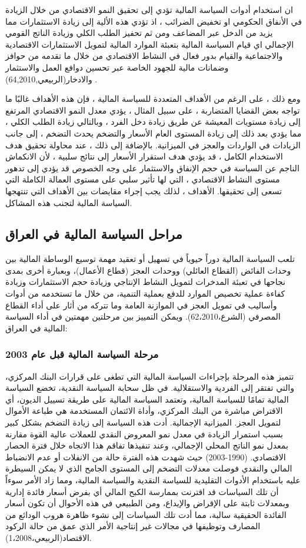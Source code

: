 \documentclass[10pt,a4paper]{report}
\begin{document}
\begin{doublespacing}
ان استخدام أدوات السياسة المالية تؤدي إلى تحقيق النمو الاقتصادي من خلال الزيادة في الأنفاق الحكومي او تخفيض الضرائب ، اذ تؤدي هذه الألية إلى زيادة الاستثمارات مما يزيد من الدخل عبر المضاعف ومن ثم تحفيز الطلب الكلي وزيادة الناتج القومي الإجمالي اي قيام السياسة المالية بتعبئة الموارد المالية لتمويل الاستثمارات الاقتصادية والاجتماعية والقيام بدور فعال في النشاط الاقتصادي من خلال ما تقدمه من حوافز وضمانات مالية للجهود الخاصة عبر تحسين دوافع العمل والاستثمار والادخار(الربيعي,64,2010) .

ومع ذلك ، على الرغم من الأهداف المتعددة للسياسة المالية ، فإن هذه الأهداف غالبًا ما تواجه بعض القضايا المتضاربة ، على سبيل المثال ، يؤدي معدل النمو الاقتصادي المرتفع إلى زيادة مستويات المعيشة عن طريق زيادة دخل الفرد ، وبالتالي زيادة الطلب الكلي ، مما يؤدي بعد ذلك إلى زيادة المستوى العام الأسعار والتضخم يحدث التضخم ، إلى جانب الزيادات في الواردات والعجز في الميزانية. بالإضافة إلى ذلك ، عند محاولة تحقيق هدف الاستخدام الكامل ، قد يؤدي هدف استقرار الأسعار إلى نتائج سلبية ، لأن الانكماش الناجم عن السياسة في حجم الإنفاق والاستثمار على وجه الخصوص قد يؤدي إلى تدهور مستوى النشاط الاقتصادي ، التي لها تأثير سلبي على مستوى العمالة الكاملة التي تسعى إلى تحقيقها. الأهداف ، لذلك يجب إجراء مقايضات بين الأهداف التي تنتهجها السياسة المالية لتجنب هذه المشاكل.
\subsection{مراحل السياسة المالية في العراق}
تلعب السياسة المالية دوراً حيوياً في تسهيل أو تعقيد مهمة توسيع الوساطة المالية بين وحدات الفائض (القطاع العائلي) ووحدات العجز (قطاع الأعمال)، وبعبارة أخرى بمدى نجاحها في تعبئة المدخرات لتمويل النشاط الإنتاجي وزيادة حجم الاستثمارات وزيادة كفاءة عملية تخصيص الموارد للدفع بعملية التنمية، من خلال ما تستخدمه من أدوات وأساليب في تمويل العجز في الموازنة العامة وما تتركه من أثار على أداء القطاع المصرفي (الشرع،62،2010). ويمكن التمييز بين مرحلتين مهمتين في أداء السياسة المالية في العراق:
\subsubsection{مرحلة السياسة المالية قبل عام 2003}
تتميز هذه المرحلة بإجراءات السياسة المالية التي تطغى على قرارات البنك المركزي، والتي تفتقر إلى الفردية والاستقلالية. في ظل سحابة السياسة النقدية، تخضع السياسة المالية تمامًا للسياسة المالية، وتعتمد السياسة المالية على طريقة تسييل الديون، أي الاقتراض مباشرة من البنك المركزي، وأداة الائتمان المستخدمة هي طباعة الأموال لتمويل العجز. الميزانية الإجمالية. أدت هذه السياسة إلى زيادة التضخم بشكل كبير بسبب استمرار الزيادة في معدل نمو المعروض النقدي للعملات عالية القوة مقارنة بمعدل نمو الناتج المحلي الإجمالي، وعند تنفيذها تفاقم هذا الاتجاه خلال فترة الحصار الاقتصادي. (1990-2003) حيث شهدت هذه الفترة حالة من الانفلات أو عدم الانضباط المالي والنقدي فوصلت معدلات التضخم إلى المستوى الجامح الذي لا يمكن السيطرة عليه باستخدام الأدوات التقليدية للسياسة النقدية والسياسة المالية، ومما زاد الأمر سوءاً أن تلك السياسات قد اقترنت بممارسة الكبح المالي أي بفرض أسعار فائدة إدارية وبمعدلات ثابتة على الإقراض والإيداع، ومن الطبيعي في هذه الأحوال أن تكون أسعار الفائدة الحقيقية سالبة، مما أدت تلك السياسات إلى نشوء ظاهرة هروب الودائع من المصارف وتوظيفها في مجالات غير إنتاجية الأمر الذي عمق من حالة الركود الاقتصاد(الربيعي،1،2008).

\end{doublespacing}
\end{document}
